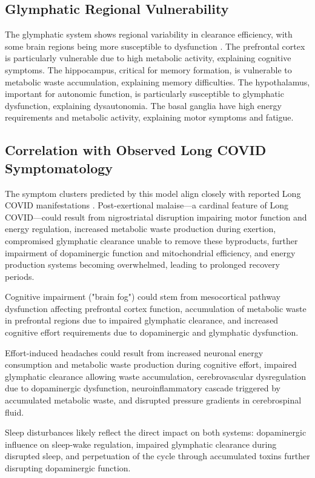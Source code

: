 \documentclass[12pt]{article}
\begin{document}
\subsection{Glymphatic Regional Vulnerability}

The glymphatic system shows regional variability in clearance efficiency, with some brain regions being more susceptible to dysfunction \citep{Kress2014}. The prefrontal cortex is particularly vulnerable due to high metabolic activity, explaining cognitive symptoms. The hippocampus, critical for memory formation, is vulnerable to metabolic waste accumulation, explaining memory difficulties. The hypothalamus, important for autonomic function, is particularly susceptible to glymphatic dysfunction, explaining dysautonomia. The basal ganglia have high energy requirements and metabolic activity, explaining motor symptoms and fatigue.

\subsection{Correlation with Observed Long COVID Symptomatology}

The symptom clusters predicted by this model align closely with reported Long COVID manifestations \citep{graham2021longcovidneuro, davis2021longcovidcohort}. Post-exertional malaise—a cardinal feature of Long COVID—could result from nigrostriatal disruption impairing motor function and energy regulation, increased metabolic waste production during exertion, compromised glymphatic clearance unable to remove these byproducts, further impairment of dopaminergic function and mitochondrial efficiency, and energy production systems becoming overwhelmed, leading to prolonged recovery periods.

Cognitive impairment ("brain fog") could stem from mesocortical pathway dysfunction affecting prefrontal cortex function, accumulation of metabolic waste in prefrontal regions due to impaired glymphatic clearance, and increased cognitive effort requirements due to dopaminergic and glymphatic dysfunction.

Effort-induced headaches could result from increased neuronal energy consumption and metabolic waste production during cognitive effort, impaired glymphatic clearance allowing waste accumulation, cerebrovascular dysregulation due to dopaminergic dysfunction, neuroinflammatory cascade triggered by accumulated metabolic waste, and disrupted pressure gradients in cerebrospinal fluid.

Sleep disturbances likely reflect the direct impact on both systems: dopaminergic influence on sleep-wake regulation, impaired glymphatic clearance during disrupted sleep, and perpetuation of the cycle through accumulated toxins further disrupting dopaminergic function.
\end{document}
